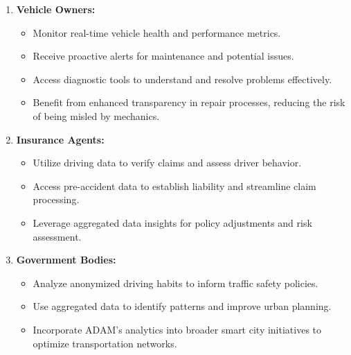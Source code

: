 \begin{enumerate}
    \item \textbf{Vehicle Owners:}
    \begin{itemize}
        \item[-] Monitor real-time vehicle health and performance metrics.
        \item[-] Receive proactive alerts for maintenance and potential issues.
        \item[-] Access diagnostic tools to understand and resolve problems effectively.
        \item[-] Benefit from enhanced transparency in repair processes, reducing the risk of being misled by mechanics.
    \end{itemize}
    
    \item \textbf{ Insurance Agents:}
    \begin{itemize}
        \item[-] Utilize driving data to verify claims and assess driver behavior.
        \item[-] Access pre-accident data to establish liability and streamline claim processing.
        \item[-] Leverage aggregated data insights for policy adjustments and risk assessment.
    \end{itemize}

    \item \textbf{Government Bodies:}
    \begin{itemize}
        \item[-] Analyze anonymized driving habits to inform traffic safety policies.
        \item[-] Use aggregated data to identify patterns and improve urban planning.
        \item[-] Incorporate ADAM’s analytics into broader smart city initiatives to optimize transportation networks.
    \end{itemize}
\end{enumerate}

